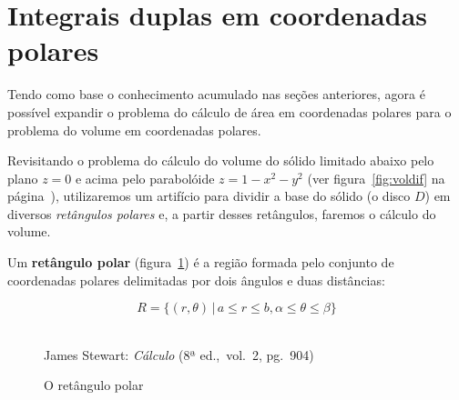 \section{Integrais duplas em coordenadas polares}
\label{sec:int2polar}

Tendo como base o conhecimento acumulado nas seções anteriores, agora
é possível expandir o problema do cálculo de área em coordenadas
polares para o problema do volume em coordenadas polares.

Revisitando o problema do cálculo do volume do sólido limitado abaixo
pelo plano $z = 0$ e acima pelo parabolóide $z = 1 - x^2 - y^2$ (ver
figura~\ref{fig:voldif} na página~\pageref{fig:voldif}),
utilizaremos um artifício para dividir a
base do sólido (o disco $D$) em diversos \emph{retângulos polares} e, a
partir desses retângulos, faremos o cálculo do volume.

Um \textbf{retângulo polar} (figura~\ref{fig:retangpolar}) é a região
formada pelo conjunto de coordenadas polares delimitadas por dois
ângulos e duas distâncias:

\begin{equation}
R = \{(r,\theta)\, | \, a \le r \le b,
\alpha \le \theta \le \beta\}
\end{equation}

\begin{figure}[H]
  \begin{center}
    \caption{O retângulo polar}
    \label{fig:retangpolar}
    \\
    \footnotesize{James Stewart: \emph{Cálculo} (8ª ed.,\ vol.\ 2, pg.\ 904)}
  \end{center}
\end{figure}

